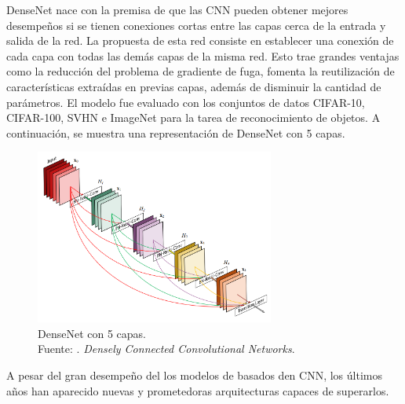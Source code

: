 DenseNet nace con la premisa de que las CNN pueden obtener mejores desempeños si se tienen conexiones cortas entre las capas cerca de la entrada y salida de la red. La propuesta de esta red consiste en establecer una conexión de cada capa con todas las demás capas de la misma red. Esto trae grandes ventajas como la reducción del problema de gradiente de fuga, fomenta la reutilización de características extraídas en previas capas, además de disminuir la cantidad de parámetros. El modelo fue evaluado con los conjuntos de datos CIFAR-10, CIFAR-100, SVHN e ImageNet para la tarea de reconocimiento de objetos. \parencite{pr_huang2016densconn} A continuación, se muestra una representación de DenseNet con 5 capas.

\begin{figure}[H]
	\begin{center}
		\includegraphics[width=0.70\textwidth]{2/figures/densenet_5lay.png}
		\caption[DenseNet con 5 capas]{DenseNet con 5 capas. \\
		Fuente: \cite{pr_huang2016densconn}. \textit{Densely Connected Convolutional Networks}.}
		\label{2:fig205}
	\end{center}
\end{figure}


A pesar del gran desempeño del los modelos de basados den CNN, los últimos años han aparecido nuevas y prometedoras arquitecturas capaces de superarlos.

